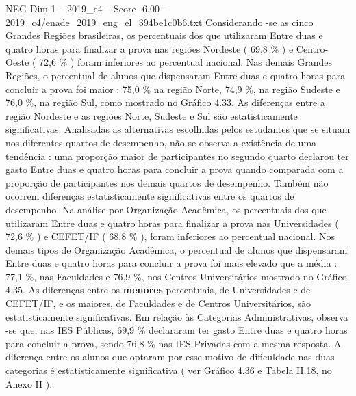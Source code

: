 \begin{textsample}{NEG Dim 1 – 2019\_c4 – Score -6.00 – 2019\_c4/enade\_2019\_eng\_el\_394be1c0b6.txt}
Considerando -se as cinco Grandes Regiões brasileiras, os percentuais dos que utilizaram Entre duas e quatro horas para finalizar a prova nas regiões Nordeste ( 69,8 \% ) e Centro-Oeste ( 72,6 \% ) foram inferiores ao percentual nacional.
Nas demais Grandes Regiões, o percentual de alunos que dispensaram Entre duas e quatro horas para concluir a prova foi maior : 75,0 \% na região Norte, 74,9 \%, na região Sudeste e 76,0 \%, na região Sul, como mostrado no Gráfico 4.33.
As diferenças entre a região Nordeste e as regiões Norte, Sudeste e Sul são estatisticamente significativas.
Analisadas as alternativas escolhidas pelos estudantes que se situam nos diferentes quartos de desempenho, não se observa a existência de uma tendência : uma proporção maior de participantes no segundo quarto declarou ter gasto Entre duas e quatro horas para concluir a prova quando comparada com a proporção de participantes nos demais quartos de desempenho.
Também não ocorrem diferenças estatisticamente significativas entre os quartos de desempenho.
Na análise por Organização Acadêmica, os percentuais dos que utilizaram Entre duas e quatro horas para finalizar a prova nas Universidades ( 72,6 \% ) e CEFET/IF ( 68,8 \% ), foram inferiores ao percentual nacional.
Nos demais tipos de Organização Acadêmica, o percentual de alunos que dispensaram Entre duas e quatro horas para concluir a prova foi mais elevado que a média : 77,1 \%, nas Faculdades e 76,9 \%, nos Centros Universitários mostrado no Gráfico 4.35.
As diferenças entre os \textbf{menores} percentuais, de Universidades e de CEFET/IF, e os maiores, de Faculdades e de Centros Universitários, são estatisticamente significativas.
Em relação às Categorias Administrativas, observa -se que, nas IES Públicas, 69,9 \% declararam ter gasto Entre duas e quatro horas para concluir a prova, sendo 76,8 \% nas IES Privadas com a mesma resposta.
A diferença entre os alunos que optaram por esse motivo de dificuldade nas duas categorias é estatisticamente significativa ( ver Gráfico 4.36 e Tabela II.18, no Anexo II ).

\end{textsample}
